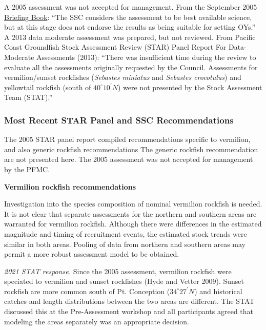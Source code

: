 \documentclass[
  english,
  a4paper,
]{article}
\begin{document}
A 2005 assessment was not accepted for management.
From the September 2005 \href{https://www.pcouncil.org/documents/2005/09/f-groundfish-management-september-2005.pdf/}{Briefing Book}:
``The SSC considers the assessment to be best available science, but at this stage does not
endorse the results as being suitable for setting OYs.'' A 2013 data moderate
assessment was prepared, but not reviewed. From Pacific Coast Groundfish Stock
Assessment Review (STAR) Panel Report For Data-Moderate Assessments (2013):
``There was insufficient time during the review to evaluate all the assessments
originally requested by the Council. Assessments for vermilion/sunset rockfishes
(\emph{Sebastes miniatus} and \emph{Sebastes crocotulus}) and yellowtail rockfish
(south of $40^\circ 10^\prime N$) were not presented by the Stock Assessment Team (STAT).''

\hypertarget{most-recent-star-panel-and-ssc-recommendations}{%
\subsubsection{Most Recent STAR Panel and SSC Recommendations}\label{most-recent-star-panel-and-ssc-recommendations}}

The 2005 STAR panel report compiled recommendations specific to vermilion, and also
generic rockfish recommendations The generic rockfish recommendation are not
presented here. The 2005 assessment was not accepted for management by the PFMC.

\textbf{Vermilion rockfish recommendations}

Investigation into the species composition of nominal vermilion rockfish is needed.
It is not clear that separate assessments for the northern and southern areas are warranted
for vermilion rockfish. Although there were differences in the estimated magnitude and
timing of recruitment events, the estimated stock trends were similar in both areas.
Pooling of data from northern and southern areas may permit a more robust assessment
model to be obtained.

\emph{2021 STAT response.} Since the 2005 assessment, vermilion rockfish were speciated
to vermilion and sunset rockfishes (Hyde and Vetter 2009). Sunset rockfish are more common south of
Pt. Conception ($34^\circ 27^\prime N$) and historical catches and length distributions between
the two areas are different. The STAT discussed this at the Pre-Assessment workshop
and all participants agreed that modeling the areas separately was an appropriate
decision.
\end{document}
